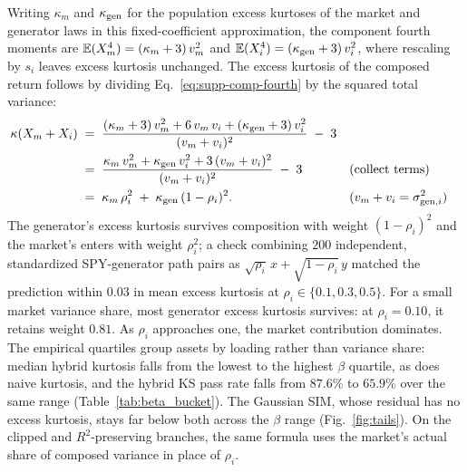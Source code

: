 Writing $\kappa_m$ and $\kappa_{\mathrm{gen}}$ for the population excess kurtoses of the market and generator laws in this fixed-coefficient approximation, the component
fourth moments are $\mathbb{E}(X_m^4) = (\kappa_m + 3)\, v_m^2$ and
$\mathbb{E}(X_i^4) = (\kappa_{\mathrm{gen}} + 3)\, v_i^2$, where rescaling by $s_i$
leaves excess kurtosis unchanged. The excess kurtosis of the composed
return follows by dividing Eq.~\eqref{eq:supp-comp-fourth} by the
squared total variance:
\begin{align}
  \kappa(X_m + X_i)
   &\;=\; \frac{(\kappa_m + 3)\, v_m^2 + 6\, v_m\, v_i
     + (\kappa_{\mathrm{gen}} + 3)\, v_i^2}{(v_m + v_i)^2} \;-\; 3
     \notag \\
   &\;=\; \frac{\kappa_m\, v_m^2 + \kappa_{\mathrm{gen}}\, v_i^2
     + 3\, (v_m + v_i)^2}{(v_m + v_i)^2} \;-\; 3
     && \text{(collect terms)} \notag \\
   &\;=\; \kappa_m\, \rho_i^2 \;+\; \kappa_{\mathrm{gen}}\, (1 - \rho_i)^2.
     && \text{($v_m + v_i = \sigma_{\mathrm{gen},i}^2$)}
  \label{eq:supp-kurt-comp}
\end{align}
The generator's excess kurtosis survives composition with weight
$(1 - \rho_i)^2$ and the market's enters with weight $\rho_i^2$; a check combining $200$ independent, standardized SPY-generator path pairs as $\sqrt{\rho_i}\,x+\sqrt{1-\rho_i}\,y$ matched the prediction within $0.03$ in mean excess kurtosis at $\rho_i\in\{0.1,0.3,0.5\}$. For a small market variance share, most generator excess kurtosis survives: at $\rho_i = 0.10$, it
retains weight $0.81$. As $\rho_i$ approaches one, the market contribution dominates.
The empirical quartiles group assets by loading rather than variance
share: median hybrid kurtosis falls from the lowest to the highest
$\beta$ quartile, as does naive kurtosis, and the hybrid KS pass rate
falls from $87.6\%$ to $65.9\%$ over the same range
(Table~\ref{tab:beta_bucket}). The Gaussian SIM, whose residual has no
excess kurtosis, stays far below both across the $\beta$ range
(Fig.~\ref{fig:tails}). On the clipped and $R^2$-preserving branches, the same formula uses the market's actual share of composed variance in place of $\rho_i$.

\begin{table}[H]
  \centering
  \caption{\textbf{Aggregate metrics by $\beta$ quartile, across composition methods.}
    Quartile cutoffs are computed from the calibrated $\beta$ distribution
    across the $423$-ticker universe. Pass rates pool equal numbers of paths per asset; other entries are medians across paths in the bucket. The GARCH rows use eligible fits among $393$ assets, while the other methods cover all $423$.}
  \label{tab:beta_bucket}
  \small
  
\end{table}

